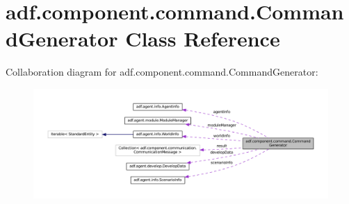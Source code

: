 \hypertarget{classadf_1_1component_1_1command_1_1CommandGenerator}{}\section{adf.\+component.\+command.\+Command\+Generator Class Reference}
\label{classadf_1_1component_1_1command_1_1CommandGenerator}


Collaboration diagram for adf.\+component.\+command.\+Command\+Generator\+:
\nopagebreak
\begin{figure}[H]
\begin{center}
\leavevmode
\includegraphics[width=350pt]{classadf_1_1component_1_1command_1_1CommandGenerator__coll__graph}
\end{center}
\end{figure}
